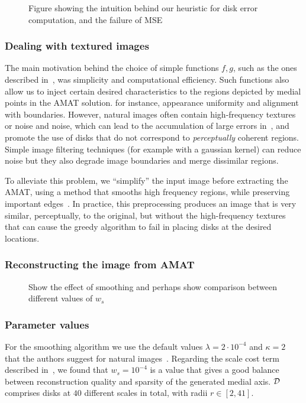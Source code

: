 \documentclass[10pt,twocolumn,letterpaper]{article}
\begin{document}
\begin{figure}
\caption{Figure showing the intuition behind our heuristic for disk error computation, and the failure of MSE}
\label{fig:heuristic}
\end{figure}


\subsubsection*{Dealing with textured images}
The main motivation behind the choice of simple functions $f,g$, such as the ones described in~, was simplicity and 
computational efficiency.
Such functions also allow us to inject certain desired characteristics to the regions depicted by medial points in the AMAT solution.
for instance, appearance uniformity and alignment with boundaries.
However, natural images often contain high-frequency textures or noise and noise, which can lead to the accumulation of large errors 
in~, and promote the use of disks that do not correspond to \emph{perceptually} coherent regions. 
Simple image filtering techniques (for example with a gaussian kernel) can reduce noise but they also degrade image boundaries and
merge dissimilar regions.

To alleviate this problem, we ``simplify'' the input image before extracting the AMAT, using a method that smooths high frequency
regions, while preserving important edges~\cite{xu2011image}.
In practice, this preprocessing produces an image that is very similar, perceptually, to the original, 
but without the high-frequency textures that can cause the greedy algorithm to fail in placing disks at the desired locations.

\subsubsection*{Reconstructing the image from AMAT}
\begin{figure}
\caption{Show the effect of smoothing and perhaps show comparison between different values of $w_s$}
\end{figure}

\subsubsection*{Parameter values}
For the smoothing algorithm we use the default values $\lambda=2\cdot10^{-4}$ and $\kappa=2$ that 
the authors suggest for natural images~\cite{xu2011image}.
Regarding the scale cost term described in~, we found that $w_s=10^{-4}$ is a value that 
gives a good balance between reconstruction quality and sparsity of the generated medial axis.
$\mathcal{D}$ comprises disks at $40$ different scales in total, with radii $r\in[2,41]$.
\end{document}
